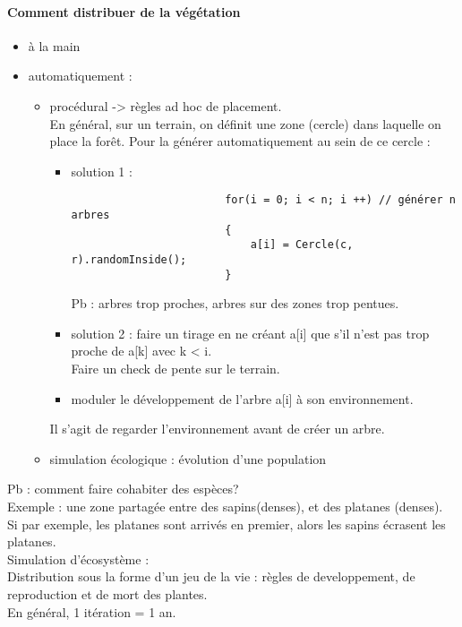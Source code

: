 \documentclass[11pt]{article}
\begin{document}
{\paragraph{Comment distribuer de la végétation}
\begin{itemize}
	\item à la main
	\item automatiquement :
		\begin{itemize}
			\item procédural -> règles ad hoc de placement.\\
				En général, sur un terrain, on définit une zone (cercle) dans laquelle on place la forêt. Pour la générer automatiquement au sein de ce cercle :
				\begin{itemize}
					\item solution 1 : \begin{verbatim}
						for(i = 0; i < n; i ++)	// générer n arbres
						{
							a[i] = Cercle(c, r).randomInside();
						}
					\end{verbatim}
					Pb : arbres trop proches, arbres sur des zones trop pentues.
				\item solution 2 : faire un tirage en ne créant a[i] que s'il n'est pas trop proche de a[k] avec k < i.\\
					Faire un check de pente sur le terrain.
				\item moduler le développement de l'arbre a[i] à son environnement.
				\end{itemize}
				Il s'agit de regarder l'environnement avant de créer un arbre.
			\item simulation écologique : évolution d'une population
		\end{itemize}
\end{itemize}
Pb : comment faire cohabiter des espèces?\\
Exemple : une zone partagée entre des sapins(denses), et des platanes (denses).\\
Si par exemple, les platanes sont arrivés en premier, alors les sapins écrasent les platanes.\\

Simulation d'écosystème :\\
Distribution sous la forme d'un jeu de la vie : règles de developpement, de reproduction et de mort des plantes.\\
En général, 1 itération = 1 an.

}
\end{document}
